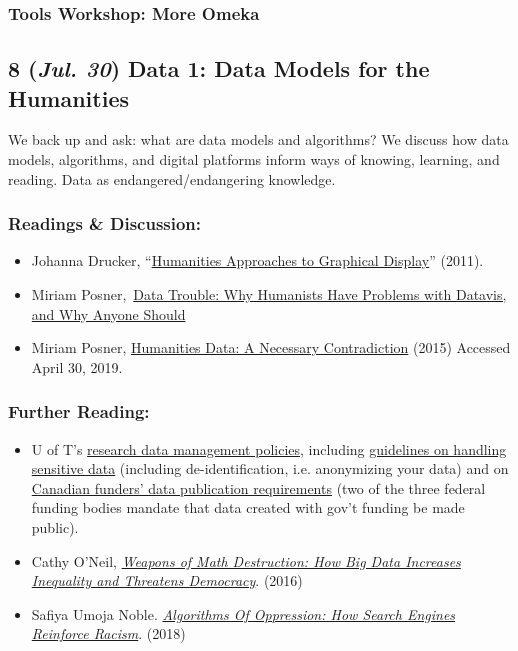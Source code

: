 \documentclass[11pt]{article}
\begin{document}
\subsubsection*{Tools Workshop: More Omeka}
\label{sec:org2056513}
\subsection*{8 (\textit{Jul. 30}) Data 1: Data Models for the Humanities}
\label{sec:orgf9076a4}
We back up and ask: what are data models and algorithms? We discuss how data models, algorithms, and digital platforms inform ways of knowing, learning, and reading. Data as endangered/endangering knowledge. 
\subsubsection*{Readings \& Discussion:}
\label{sec:orgafc115a}
\begin{itemize}
\item Johanna Drucker, “\href{http://www.digitalhumanities.org/dhq/vol/5/1/000091/000091.html}{Humanities Approaches to Graphical Display}” (2011).
\item Miriam Posner, \href{https://www.youtube.com/watch?v=sW0u1pNQNxc}{Data Trouble: Why Humanists Have Problems with Datavis, and Why Anyone Should}
\item Miriam Posner, \href{http://miriamposner.com/blog/humanities-data-a-necessary-contradiction/}{Humanities Data: A Necessary Contradiction} (2015) Accessed April 30, 2019.
\end{itemize}
\subsubsection*{Further Reading:}
\label{sec:orgcda2a33}
\begin{itemize}
\item U of T's \href{https://onesearch.library.utoronto.ca/researchdata}{research data management policies}, including \href{https://onesearch.library.utoronto.ca/researchdata/sensitive-data}{guidelines on handling sensitive data} (including de-identification, i.e. anonymizing your data) and on \href{https://onesearch.library.utoronto.ca/researchdata/funder-requirements}{Canadian funders' data publication requirements} (two of the three federal funding bodies mandate that data created with gov't funding be made public).
\item Cathy O’Neil, \emph{\href{https://search.library.utoronto.ca/search?Ntx=mode\%2520matchallpartial\&Ntk=Anywhere\&N=0\&Ntt=\%2522weapons\%2520of\%2520math\%2520destruction\%2522\&Nr=p\_work\_normalized:ONeil\%2520Cathy\%2520Weapons\%2520of\%2520math\%2520destruction\&uuid=7c23a669-7240-41dc-94d6-592f201cb609}{Weapons of Math Destruction: How Big Data Increases Inequality and Threatens Democracy}}. (2016)
\item Safiya Umoja Noble. \emph{\href{https://ebookcentral-proquest-com.myaccess.library.utoronto.ca/lib/utoronto/detail.action?docID=4834260}{Algorithms Of Oppression: How Search Engines Reinforce Racism}}. (2018)
\end{itemize}
\end{document}
